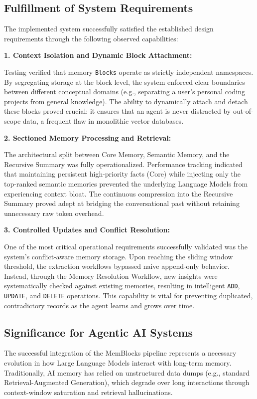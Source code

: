 \documentclass[12pt,a4paper]{article}
\begin{document}
\subsection{Fulfillment of System Requirements}

The implemented system successfully satisfied the established design requirements through the following observed capabilities:

\textbf{1. Context Isolation and Dynamic Block Attachment:}\par
Testing verified that memory \texttt{Blocks} operate as strictly independent namespaces. By segregating storage at the block level, the system enforced clear boundaries between different conceptual domains (e.g., separating a user's personal coding projects from general knowledge). The ability to dynamically attach and detach these blocks proved crucial: it ensures that an agent is never distracted by out-of-scope data, a frequent flaw in monolithic vector databases.

\textbf{2. Sectioned Memory Processing and Retrieval:}\par
The architectural split between Core Memory, Semantic Memory, and the Recursive Summary was fully operationalized. Performance tracking indicated that maintaining persistent high-priority facts (Core) while injecting only the top-ranked semantic memories prevented the underlying Language Models from experiencing context bloat. The continuous compression into the Recursive Summary proved adept at bridging the conversational past without retaining unnecessary raw token overhead. 

\textbf{3. Controlled Updates and Conflict Resolution:}\par
One of the most critical operational requirements successfully validated was the system's conflict-aware memory storage. Upon reaching the sliding window threshold, the extraction workflows bypassed naive append-only behavior. Instead, through the Memory Resolution Workflow, new insights were systematically checked against existing memories, resulting in intelligent \texttt{ADD}, \texttt{UPDATE}, and \texttt{DELETE} operations. This capability is vital for preventing duplicated, contradictory records as the agent learns and grows over time.

\subsection{Significance for Agentic AI Systems}

The successful integration of the MemBlocks pipeline represents a necessary evolution in how Large Language Models interact with long-term memory. Traditionally, AI memory has relied on unstructured data dumps (e.g., standard Retrieval-Augmented Generation), which degrade over long interactions through context-window saturation and retrieval hallucinations.
\end{document}
